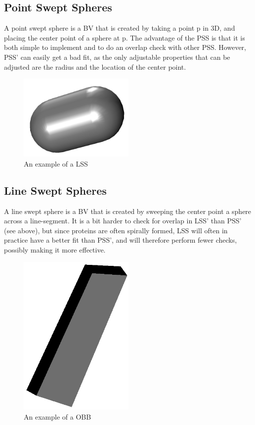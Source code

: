 \subsection{Point Swept Spheres}
A point swept sphere is a BV that is created by taking a point p in 3D, and placing the center point of a sphere at p. The advantage of the PSS is that it is both simple to implement and to do an overlap check with other PSS. However, PSS' can easily get a bad fit, as the only adjustable properties that can be adjusted are the radius and the location of the center point.

\begin{figure}
\centering
\includegraphics[width=0.5\textwidth]{figures/lss}
\caption{\label{lss-example}An example of a LSS}
\end{figure}

\subsection{Line Swept Spheres}
A line swept sphere is a BV that is created by sweeping the center point a sphere across a line-segment. It is a bit harder to check for overlap in LSS' than PSS' (see above), but since proteins are often spirally formed, LSS will often in practice have a better fit than PSS', and will therefore perform fewer checks, possibly making it more effective.

\begin{figure}
\centering
\includegraphics[width=0.5\textwidth]{figures/obb}
\caption{\label{obb-example}An example of a OBB}
\end{figure}

